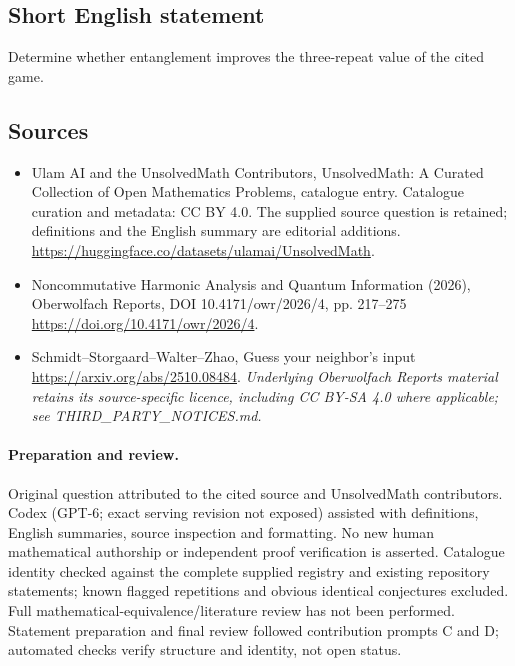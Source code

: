 \documentclass[11pt]{article}
\begin{document}
\subsection{Short English statement}
Determine whether entanglement improves the three-repeat value of the cited game.
\subsection{Sources}
\begin{itemize}
\item[\hypertarget{source:statement:1}{S1}] Ulam AI and the UnsolvedMath Contributors, UnsolvedMath: A Curated Collection of Open Mathematics Problems, catalogue entry. Catalogue curation and metadata: CC BY 4.0. The supplied source question is retained; definitions and the English summary are editorial additions.
\url{https://huggingface.co/datasets/ulamai/UnsolvedMath}.
\item[\hypertarget{source:statement:2}{S2}] Noncommutative Harmonic Analysis and Quantum Information (2026), Oberwolfach Reports, DOI 10.4171/owr/2026/4, pp. 217--275
\url{https://doi.org/10.4171/owr/2026/4}.
\item[\hypertarget{source:statement:3}{S3}] Schmidt--Storgaard--Walter--Zhao, Guess your neighbor's input
\url{https://arxiv.org/abs/2510.08484}.
\textit{Underlying Oberwolfach Reports material retains its source-specific licence, including CC BY-SA 4.0 where applicable; see THIRD\_PARTY\_NOTICES.md.}
\end{itemize}
\paragraph{Preparation and review.}
Original question attributed to the cited source and UnsolvedMath contributors. Codex (GPT-6; exact serving revision not exposed) assisted with definitions, English summaries, source inspection and formatting. No new human mathematical authorship or independent proof verification is asserted. Catalogue identity checked against the complete supplied registry and existing repository statements; known flagged repetitions and obvious identical conjectures excluded. Full mathematical-equivalence/literature review has not been performed. Statement preparation and final review followed contribution prompts C and D; automated checks verify structure and identity, not open status.
\label{end:statement}
\end{document}
